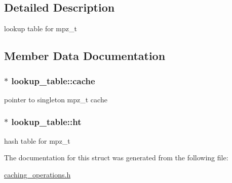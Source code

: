 \subsection{Detailed Description}
lookup table for mpz\+\_\+t 

\subsection{Member Data Documentation}
\subsubsection[{\texorpdfstring{cache}{cache}}]{$\ast$ lookup\+\_\+table\+::cache}\hypertarget{structlookup__table_a120547b02b115a402c758cf630ed22b1}{}\label{structlookup__table_a120547b02b115a402c758cf630ed22b1}
pointer to singleton mpz\+\_\+t cache 
\subsubsection[{\texorpdfstring{ht}{ht}}]{$\ast$ lookup\+\_\+table\+::ht}\hypertarget{structlookup__table_a2066d36e3a0f245e7f428f1e951cd947}{}\label{structlookup__table_a2066d36e3a0f245e7f428f1e951cd947}
hash table for mpz\+\_\+t 

The documentation for this struct was generated from the following file\+:\begin{DoxyCompactItemize}
\item 
\hyperlink{caching__operations_8h}{caching\+\_\+operations.\+h}\end{DoxyCompactItemize}
